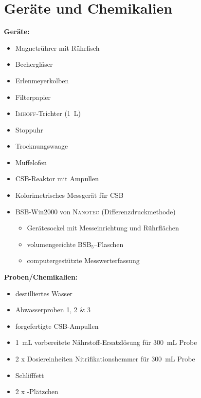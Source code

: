 \chapter{Geräte und Chemikalien}
\label{sec:geraete}

\textbf{Geräte:}
\begin{itemize}
	\item Magnetrührer mit Rührfisch
	\item Bechergläser
	\item Erlenmeyerkolben
	\item Filterpapier
	\item \textsc{Imhoff}-Trichter (\SI{1}{\liter})
	\item Stoppuhr
	\item Trocknungswaage
	\item Muffelofen
	\item CSB-Reaktor mit Ampullen
	\item Kolorimetrisches Messgerät für CSB
	\item BSB-Win2000 von \textsc{Nanotec} (Differenzdruckmethode)
		\begin{itemize}
			\item Gerätesockel mit Messeinrichtung und Rührflächen
			\item volumengeeichte BSB$_5$–Flaschen
			\item computergestützte Messwerterfassung 
		\end{itemize}
	
\end{itemize}

\vspace*{5mm}

\textbf{Proben/Chemikalien:}
\begin{itemize}
	\item destilliertes Wasser
	\item Abwasserproben 1, 2 \& 3
	\item forgefertigte CSB-Ampullen
	\item \SI{1}{\milli \liter} vorbereitete Nährstoff-Ersatzlösung für \SI{300}{\milli \liter} Probe
	\item 2 x Dosiereinheiten Nitrifikationshemmer für \SI{300}{\milli \liter} Probe
	\item Schlifffett
	\item 2 x -Plätzchen
\end{itemize}



